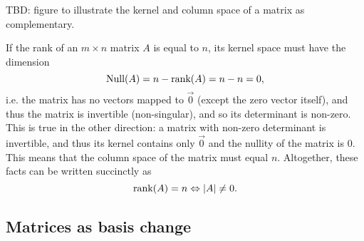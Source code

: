 TBD: figure to illustrate the kernel and column space of a matrix as complementary.

If the rank of an $m\times n$ matrix $A$ is equal to $n$, its kernel space must have the dimension
\begin{equation}
	\text{Null}(A) = n-\text{rank}(A) = n-n = 0,
	\label{eq:nullity_rank}
\end{equation}
i.e. the matrix has no vectors mapped to $\vec{0}$ (except the zero vector itself), and thus the matrix is invertible (non-singular), and so its determinant is non-zero. This is true in the other direction: a matrix with non-zero determinant is invertible, and thus its kernel contains only $\vec{0}$ and the nullity of the matrix is $0$. This means that the column space of the matrix must equal $n$. Altogether, these facts can be written succinctly as
\begin{equation}
	\text{rank}(A) = n \Leftrightarrow |A|\neq0.
	\label{eq:rank_det}
\end{equation}


\subsection{Matrices as basis change}

